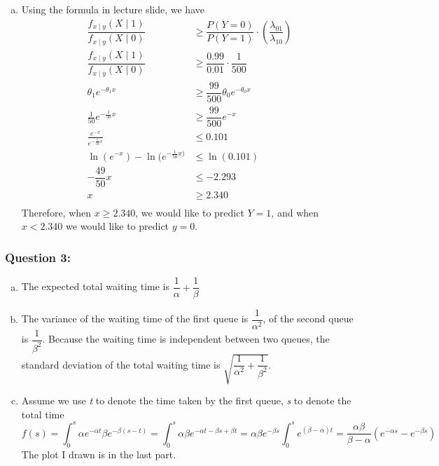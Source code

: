 \documentclass[12pt]{article}
\begin{document}
\begin{enumerate}[a)]
  \item 
  Using the formula in lecture slide, we have
  \begin{align*}
  \dfrac{f_{x \mid y}(X \mid 1)}{f_{x \mid y}(X \mid 0)} &\geq \dfrac{P(Y=0)}{P(Y=1)} \cdot \left(\dfrac{\lambda_{01}}{\lambda_{10}}\right)\\
  \dfrac{f_{x \mid y}(X \mid 1)}{f_{x \mid y}(X \mid 0)} &\geq \dfrac{0.99}{0.01} \cdot \dfrac{1}{500}\\
  \theta_{1}e^{-\theta_{1}x} &\geq \dfrac{99}{500}\theta_{0}e^{-\theta_{0}x}\\
  \frac{1}{50}e^{-\frac{1}{50}x} &\geq \dfrac{99}{500}e^{-x}\\
  \frac{e^{-x}}{e^{-\frac{1}{50}x}} &\leq 0.101\\
  \ln{(e^{-x})}-\ln{(e^{-\frac{1}{50}x)}} &\leq \ln{(0.101)}\\
  -\dfrac{49}{50}x &\leq -2.293\\
  x &\geq 2.340\\
  \end{align*}  Therefore, when $x \geq 2.340$, we would like to predict $Y=1$, and when $x<2.340$ we would like to predict $y=0$.



\end{enumerate}


\subsubsection*{Question 3:} 
\begin{enumerate}[a)]
  \item 
  The expected total waiting time is $\dfrac{1}{\alpha}+\dfrac{1}{\beta}$
  
  \item 
  The variance of the waiting time of the first queue is $\dfrac{1}{\alpha^2}$, of the second queue is $\dfrac{1}{\beta^2}$. Because the waiting time is independent between two queues, the standard deviation of the total waiting time is $\sqrt{\dfrac{1}{\alpha^2}+\dfrac{1}{\beta^2}}$.
  
     
  \item 
  Assume we use \emph{t} to denote the time taken by the first queue, \emph{s} to denote the total time
  \begin{equation*}
  f(s) = \int_{0}^{s}\alpha e^{-\alpha t}\beta e^{-\beta (s-t)} = \int_{0}^{s}\alpha \beta e^{-\alpha t -\beta s + \beta t} = \alpha \beta e^{-\beta s}\int_{0}^{s}e^{(\beta -\alpha) t} = \dfrac{\alpha \beta}{\beta -\alpha}\left(e^{-\alpha s}-e^{-\beta s}\right)
  \end{equation*}
  The plot I drawn is in the last part. 


\end{enumerate}
\end{document}
